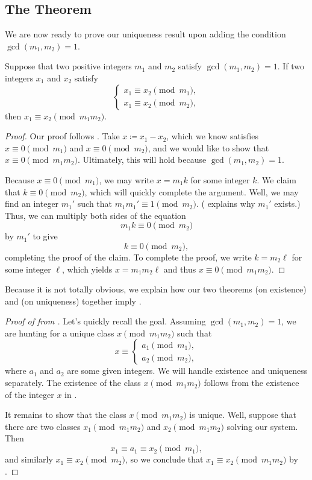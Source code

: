 \documentclass{article}
\begin{document}
\subsection{The Theorem}
We are now ready to prove our uniqueness result upon adding the condition $\gcd(m_1,m_2)=1$.
\begin{theorem} \label{thm:crt-uniq}
	Suppose that two positive integers $m_1$ and $m_2$ satisfy $\gcd(m_1,m_2)=1$. If two integers $x_1$ and $x_2$ satisfy
	\[\begin{cases}
		x_1 \equiv x_2\pmod{m_1}, \\
		x_1 \equiv x_2\pmod{m_2},
	\end{cases}\]
	then $x_1\equiv x_2\pmod{m_1m_2}$.
\end{theorem}
\begin{proof}
	Our proof follows . Take $x\coloneqq x_1-x_2$, which we know satisfies $x\equiv0\pmod{m_1}$ and $x\equiv0\pmod{m_2}$, and we would like to show that $x\equiv0\pmod{m_1m_2}$. Ultimately, this will hold because $\gcd(m_1,m_2)=1$.

	Because $x\equiv0\pmod{m_1}$, we may write $x=m_1k$ for some integer $k$. We claim that $k\equiv0\pmod{m_2}$, which will quickly complete the argument. Well, we may find an integer $m_1'$ such that $m_1m_1'\equiv1\pmod{m_2}$. ( explains why $m_1'$ exists.) Thus, we can multiply both sides of the equation
	\[m_1k\equiv0\pmod{m_2}\]
	by $m_1'$ to give
	\[k\equiv0\pmod{m_2},\]
	completing the proof of the claim. To complete the proof, we write $k=m_2\ell$ for some integer $\ell$, which yields $x=m_1m_2\ell$ and thus $x\equiv0\pmod{m_1m_2}$.
\end{proof}
Because it is not totally obvious, we explain how our two theorems  (on existence) and  (on uniqueness) together imply .
\begin{proof}[Proof of  from ]
	Let's quickly recall the goal. Assuming $\gcd(m_1,m_2)=1$, we are hunting for a unique class $x\pmod{m_1m_2}$ such that
	\[x\equiv\begin{cases}
		a_1\pmod{m_1}, \\
		a_2\pmod{m_2},
	\end{cases}\]
	where $a_1$ and $a_2$ are some given integers. We will handle existence and uniqueness separately. The existence of the class $x\pmod{m_1m_2}$ follows from the existence of the integer $x$ in .
	
	It remains to show that the class $x\pmod{m_1m_2}$ is unique. Well, suppose that there are two classes $x_1\pmod{m_1m_2}$ and $x_2\pmod{m_1m_2}$ solving our system. Then
	\[x_1\equiv a_1\equiv x_2\pmod{m_1},\]
	and similarly $x_1\equiv x_2\pmod{m_2}$, so we conclude that $x_1\equiv x_2\pmod{m_1m_2}$ by .
\end{proof}
\end{document}
